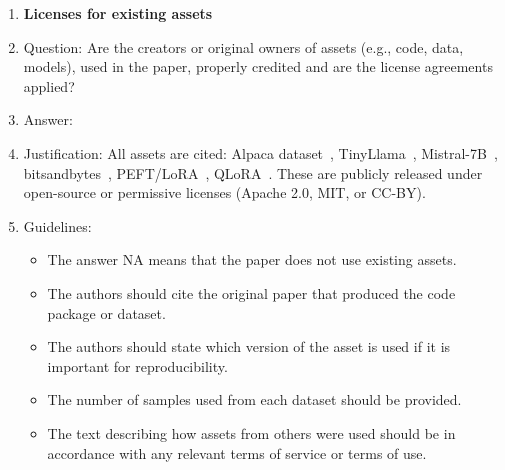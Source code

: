 \documentclass{article}
\begin{document}
\begin{enumerate}
\item {\bf Licenses for existing assets}
\item[] Question: Are the creators or original owners of assets (e.g., code, data, models), used in the paper, properly credited and are the license agreements applied?
\item[] Answer: \answerYes{}
\item[] Justification: All assets are cited: Alpaca dataset~\citep{taori2023alpaca}, TinyLlama~\citep{zhang2024tinyllama}, Mistral-7B~\citep{jiang2023mistral}, bitsandbytes~\citep{dettmers2022llmint8}, PEFT/LoRA~\citep{hu2021lora}, QLoRA~\citep{dettmers2023qlora}. These are publicly released under open-source or permissive licenses (Apache 2.0, MIT, or CC-BY).
\item[] Guidelines:
\begin{itemize}
    \item The answer NA means that the paper does not use existing assets.
    \item The authors should cite the original paper that produced the code package or dataset.
    \item The authors should state which version of the asset is used if it is important for reproducibility.
    \item The number of samples used from each dataset should be provided.
    \item The text describing how assets from others were used should be in accordance with any relevant terms of service or terms of use.
\end{itemize}


\end{enumerate}
\end{document}
